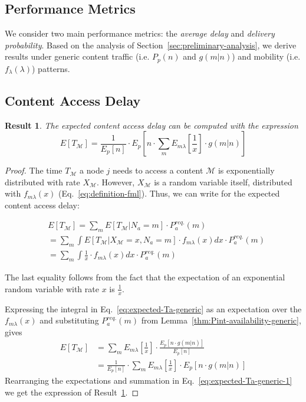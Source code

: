 \documentclass[journal]{IEEEtran}
\newtheorem{result}{Result}
\newcommand{\eq}[1]{Eq.~\eqref{#1}}
\newcommand{\XM}{{X}_{\mathcal{M}}}
\begin{document}
\subsection{Performance Metrics}\label{sec:performance-metrics}

We consider two main performance metrics: the \textit{average delay} and \textit{delivery probability}. Based on the analysis of Section~\ref{sec:preliminary-analysis}, we derive results under generic content traffic (i.e. $P_{p}(n)$ and $g(m|n)$) and mobility (i.e. $f_{\lambda}(\lambda)$) patterns.



\subsection*{\textbf{Content Access Delay}}

\begin{result}\label{result:ETm}
The expected content access delay can be computed with the expression
\begin{equation}
E[T_{\mathcal{M}}]= \frac{1}{E_{p}[n]}\cdot E_{p}\left[n\cdot\sum_{m} E_{m\lambda}\left[\frac{1}{x}\right] \cdot  g(m|n)\right]\nonumber
\end{equation}
\end{result}
\begin{proof}
The time $T_{\mathcal{M}}$ a node $j$ needs to access a content $\mathcal{M}$ is exponentially distributed with rate $X_{\mathcal{M}}$. However, $X_{\mathcal{M}}$ is a random variable itself, distributed with $f_{m\lambda}(x)$ (\eq{eq:definition-fml}). Thus, we can write for the expected content access delay:

\begin{footnotesize}
\begin{align}\label{eq:expected-Ta-generic}
&E[T_{\mathcal{M}}] 	= \sum_{m} E[T_{\mathcal{M}}\vert N_{a}=m] \cdot P_{a}^{req.}(m)\nonumber\\
					&= \sum_{m} \int E[T_{\mathcal{M}}\vert \XM=x,N_{a}=m]\cdot f_{m\lambda}(x)dx \cdot P_{a}^{req.}(m)\nonumber\\ 
					&= \sum_{m} \int \frac{1}{x}\cdot f_{m\lambda}(x)dx \cdot P_{a}^{req.}(m)
\end{align}
\end{footnotesize}
The last equality follows from the fact that the expectation of an exponential random variable with rate $x$ is $\frac{1}{x}$. 


Expressing the integral in \eq{eq:expected-Ta-generic} as an expectation over the $f_{m\lambda}(x)$ and substituting $P_{a}^{req.}(m)$ from Lemma~\ref{thm:Pint-availability-generic}, gives
\begin{align}\label{eq:expected-Ta-generic-1}
E[T_{\mathcal{M}}] 	&= \sum_{m} E_{m\lambda}\left[\frac{1}{x}\right] \cdot \frac{E_{p}[n\cdot g(m|n)]}{E_{p}[n]}\nonumber\\
					&= \frac{1}{E_{p}[n]}\cdot\sum_{m} E_{m\lambda}\left[\frac{1}{x}\right] \cdot E_{p}[n\cdot g(m|n)]
\end{align}
Rearranging the expectations and summation in \eq{eq:expected-Ta-generic-1} we get the expression of Result~\ref{result:ETm}.
\end{proof}
\end{document}
